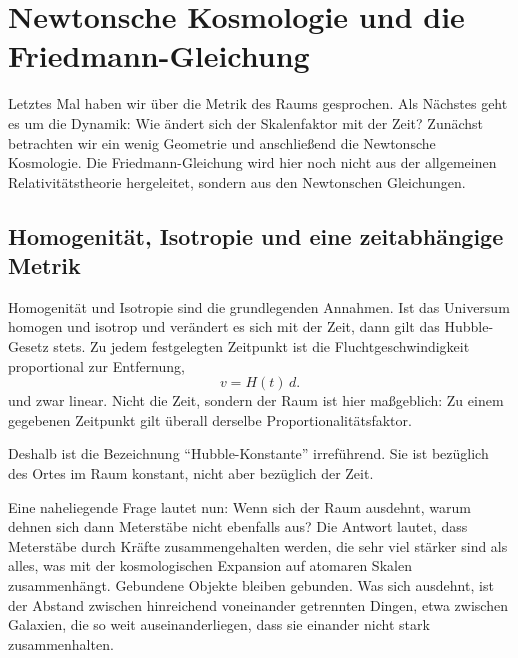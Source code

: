 \chapter{Newtonsche Kosmologie und die Friedmann-Gleichung}

Letztes Mal haben wir über die Metrik des Raums gesprochen. Als Nächstes geht es um die Dynamik: Wie ändert sich der Skalenfaktor mit der Zeit? Zunächst betrachten wir ein wenig Geometrie und anschließend die Newtonsche Kosmologie. Die Friedmann-Gleichung wird hier noch nicht aus der allgemeinen Relativitätstheorie hergeleitet, sondern aus den Newtonschen Gleichungen.

\section{Homogenität, Isotropie und eine zeitabhängige Metrik}

Homogenität und Isotropie sind die grundlegenden Annahmen. Ist das Universum homogen und isotrop und verändert es sich mit der Zeit, dann gilt das Hubble-Gesetz stets. Zu jedem festgelegten Zeitpunkt ist die Fluchtgeschwindigkeit proportional zur Entfernung,
\begin{equation}
v = H(t)\,d.
\end{equation}
und zwar linear. Nicht die Zeit, sondern der Raum ist hier maßgeblich: Zu einem gegebenen Zeitpunkt gilt überall derselbe Proportionalitätsfaktor.

\begin{classroomqa}
\end{classroomqa}

Deshalb ist die Bezeichnung ``Hubble-Konstante'' irreführend. Sie ist bezüglich des Ortes im Raum konstant, nicht aber bezüglich der Zeit.

Eine naheliegende Frage lautet nun: Wenn sich der Raum ausdehnt, warum dehnen sich dann Meterstäbe nicht ebenfalls aus? Die Antwort lautet, dass Meterstäbe durch Kräfte zusammengehalten werden, die sehr viel stärker sind als alles, was mit der kosmologischen Expansion auf atomaren Skalen zusammenhängt. Gebundene Objekte bleiben gebunden. Was sich ausdehnt, ist der Abstand zwischen hinreichend voneinander getrennten Dingen, etwa zwischen Galaxien, die so weit auseinanderliegen, dass sie einander nicht stark zusammenhalten.

